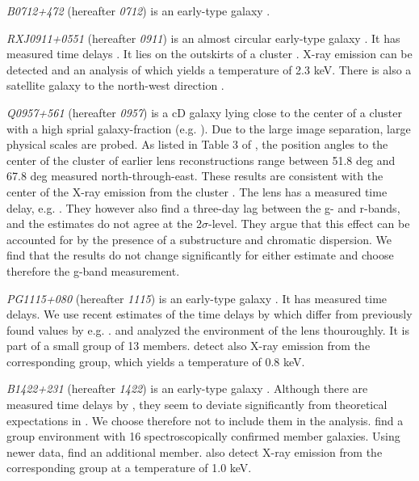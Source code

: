 \documentclass[useAMS,usenatbib]{mn2e}
\begin{document}
\textit{B0712+472} (hereafter \textit{0712}) is an early-type galaxy \citep{1998AJ....115..377F}. %

\textit{RXJ0911+0551} (hereafter \textit{0911}) is an almost circular early-type galaxy \citep{2012A&A...538A..99S}. It has measured time delays \citep{2002ApJ...572L..11H}. It lies on the outskirts of a cluster \citep{2001ApJ...555....1M}. X-ray emission can be detected and an analysis of which yields a temperature of 2.3 keV. There is also a satellite galaxy to the north-west direction \citep{2000ApJ...544L..35K}. %

\textit{Q0957+561} (hereafter \textit{0957}) is a cD galaxy lying close to the center of a cluster with a high sprial galaxy-fraction (e.g. \cite{1992MNRAS.254P..27G,1994A&A...291..411A,1998ApJ...504..661C}). Due to the large image separation, large physical scales are probed. As listed in Table 3 of \cite{2000ApJ...542...74K}, the position angles to the center of the cluster of earlier lens reconstructions range between 51.8 deg and 67.8 deg measured north-through-east. These results are consistent with the center of the X-ray emission from the cluster \citep{1998ApJ...504..661C}. The lens has a measured time delay, e.g. \citep{2012A&A...540A.132S}. They however also find a three-day lag between the g- and r-bands, and the estimates do not agree at the 2$\sigma$-level. They argue that this effect can be accounted for by the presence of a substructure and chromatic dispersion. We find that the results do not change significantly for either estimate and choose therefore the g-band measurement.

\textit{PG1115+080} (hereafter \textit{1115}) is an early-type galaxy \citep{2005ApJ...626...51Y}. It has measured time delays. We use recent estimates of the time delays by \cite{2010MNRAS.406.2764T} which differ from previously found values by e.g. \cite{1997ApJ...489...21B}. \cite{2006ApJ...641..169M} and \cite{2011ApJ...726...84W} analyzed the environment of the lens thouroughly. It is part of a small group of 13 members. \cite{2004ApJ...610..686G} detect also X-ray emission from the corresponding group, which yields a temperature of 0.8 keV.

\textit{B1422+231} (hereafter \textit{1422}) is an early-type galaxy \citep{1996ApJ...462L..53I}. Although there are measured time delays by \cite{2001MNRAS.326.1403P}, they seem to deviate significantly from theoretical expectations in \cite{2003AJ....126...29R}. We choose therefore not to include them in the analysis. \cite{2006ApJ...641..169M} find a group environment with 16 spectroscopically confirmed member galaxies. Using newer data, \cite{2011ApJ...726...84W} find an additional member. \cite{2004ApJ...610..686G} also detect X-ray emission from the corresponding group at a temperature of 1.0 keV.
\end{document}
